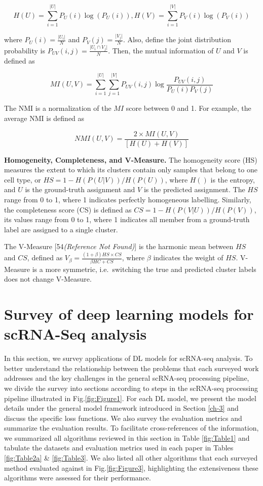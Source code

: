 \documentclass[
]{book}
\begin{document}
\[H(U)=\sum_{i=1}^{\vert U \vert}P_{U}(i)\log{(P_{U}(i))},  H(V)=\sum_{i=1}^{\vert V \vert}P_{V}(i)\log{(P_{V}(i))}\]

where \(P_{U}(i)=\frac{\vert U_{i} \vert}{N}\) and \(P_{V}(j)=\frac{\vert V_{j} \vert}{N}\). Also, define the joint distribution probability is \(P_{UV}(i,j)=\frac{\vert U_{i}\cap V_{j} \vert}{N}\). Then, the mutual information of \(U\) and \(V\) is defined as

\[MI(U,V)=\sum_{i=1}^{\vert U \vert}\sum_{j=1}^{\vert V \vert}P_{UV}(i,j)\log{\frac{P_{UV}(i,j)}{P_{U}(i)P_{V}(j)}}\]

The NMI is a normalization of the \(MI\) score between 0 and 1. For example, the average NMI is defined as \citep{RN250}

\[NMI(U,V)=\frac{2 \times MI(U,V)}{[H(U) + H(V)]}\]

\textbf{Homogeneity, Completeness, and V-Measure.} The homogeneity score (HS) measures the extent to which its clusters contain only samples that belong to one cell type, or \(HS=1-H(P(U\vert V))/H(P(U))\), where \(H()\) is the entropy, and \(U\) is the ground-truth assignment and \(V\) is the predicted assignment. The \(HS\) range from 0 to 1, where 1 indicates perfectly homogeneous labelling. Similarly, the completeness score (CS) is defined as \(CS=1-H(P(V \vert U))/H(P(V))\), its values range from 0 to 1, where 1 indicates all member from a ground-truth label are assigned to a single cluster.

The V-Measure {[}54\emph{(Reference Not Found)}{]} is the harmonic mean between \(HS\) and \(CS\), defined as \(V_{\beta}=\frac{(1+\beta)HS×CS}{\beta HC+CS}\), where \(\beta\) indicates the weight of \(HS\). V-Measure is a more symmetric, i.e.~switching the true and predicted cluster labels does not change V-Measure.

\hypertarget{ch-5}{%
\chapter{Survey of deep learning models for scRNA-Seq analysis}\label{ch-5}}

In this section, we survey applications of DL models for scRNA-seq analysis. To better understand the relationship between the problems that each surveyed work addresses and the key challenges in the general scRNA-seq processing pipeline, we divide the survey into sections according to steps in the scRNA-seq processing pipeline illustrated in Fig.\ref{fig:Figure1}. For each DL model, we present the model details under the general model framework introduced in Section \ref{ch-3} and discuss the specific loss functions. We also survey the evaluation metrics and summarize the evaluation results. To facilitate cross-references of the information, we summarized all algorithms reviewed in this section in Table \ref{fig:Table1} and tabulate the datasets and evaluation metrics used in each paper in Tables \ref{fig:Table2a} \& \ref{fig:Table3}. We also listed all other algorithms that each surveyed method evaluated against in Fig.\ref{fig:Figure3}, highlighting the extensiveness these algorithms were assessed for their performance.
\end{document}
